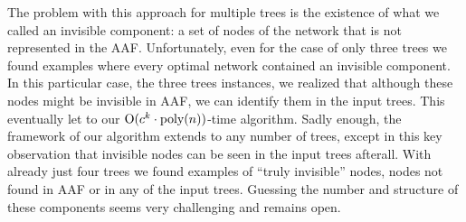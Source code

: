 The problem with this approach for multiple trees is the existence of what we called an invisible component: a set of nodes of the network that is not represented in the AAF. Unfortunately, even for the case of only three trees we found examples where every optimal network contained an invisible component. In this particular case, the three trees instances, we realized that although these nodes might be invisible in AAF, we can identify them in the input trees. This eventually let to our $\mathrm{O}(c^k \cdot \text{poly}(n))$-time algorithm. Sadly enough, the framework of our algorithm extends to any number of trees, except in this key observation that invisible nodes can be seen in the input trees afterall. With already just four trees we found examples of ``truly invisible'' nodes, nodes not found in AAF or in any of the input trees. Guessing the number and structure of these components seems very challenging and remains open. 





% 
% 
% 








